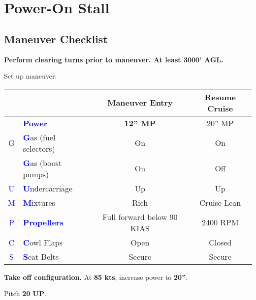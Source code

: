 \section{Power-On Stall}
\subsection{Maneuver Checklist}

\textbf{Perform clearing turns prior to maneuver. At least 3000' AGL.}

Set up maneuver:

\begin{table}[H]
\centering
\begin{tabular}{|c|l|c|c|}
\hline
                    &                                                 & \textbf{Maneuver Entry} & \textbf{Resume Cruise} \\ \hline
                    & \textcolor{blue}{\textbf{Power}}                & \textbf{12'' MP}        & 20'' MP                \\ \hline
\textcolor{blue}{G} & \textcolor{blue}{\textbf{G}}as (fuel selectors) & On                      & On                     \\
                    & \textcolor{blue}{\textbf{G}}as (boost pumps)    & On                      & Off                    \\ \hline
\textcolor{blue}{U} & \textcolor{blue}{\textbf{U}}ndercarriage        & Up                      & Up                     \\ \hline
\textcolor{blue}{M} & \textcolor{blue}{\textbf{M}}ixtures             & Rich                    & Cruise Lean            \\ \hline
\textcolor{blue}{P} & \textcolor{blue}{\textbf{Propellers}}           & Full forward below 90 KIAS & 2400 RPM            \\ \hline
\textcolor{blue}{C} & \textcolor{blue}{\textbf{C}}owl Flaps           & Open                    & Closed                 \\ \hline
\textcolor{blue}{S} & \textcolor{blue}{\textbf{S}}eat Belts           & Secure                  & Secure                 \\ \hline
\end{tabular}
\end{table}

\textbf{Take off configuration.} At \textbf{85 kts}, increase power to \textbf{20''}.

Pitch \textbf{20\degree{} UP}.

